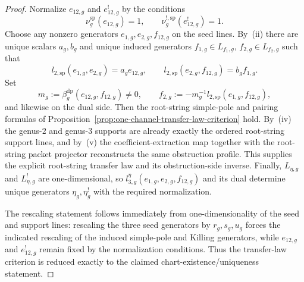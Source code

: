 \begin{proof}
Normalize $e_{12,g}$ and $e_{12,g}^!$ by the conditions
\[
\nu_g^{\mathrm{sp}}(e_{12,g})=1,
\qquad
\nu_g^{!,\mathrm{sp}}(e_{12,g}^!)=1.
\]
Choose any nonzero generators $e_{1,g},e_{2,g},f_{12,g}$ on the seed
lines.  By~\textup{(ii)} there are unique scalars $a_g,b_g$ and unique
induced generators $f_{1,g}\in L_{f_1,g}$, $f_{2,g}\in L_{f_2,g}$ such
that
\[
l_{2,\mathrm{sp}}(e_{1,g},e_{2,g})=a_g e_{12,g},
\qquad
l_{2,\mathrm{sp}}(e_{2,g},f_{12,g})=b_g f_{1,g}.
\]
Set
\[
m_g:=\beta_g^{\mathrm{dp}}(e_{12,g},f_{12,g})\neq 0,
\qquad
f_{2,g}:=-m_g^{-1}l_{2,\mathrm{sp}}(e_{1,g},f_{12,g}),
\]
and likewise on the dual side.  Then the root-string simple-pole and
pairing formulas of Proposition~\ref{prop:one-channel-transfer-law-criterion}
hold.  By~\textup{(iv)} the genus-$2$ and genus-$3$ supports are already
exactly the ordered root-string support lines, and by~\textup{(v)} the
coefficient-extraction map together with the root-string packet
projector reconstructs the same obstruction profile.  This supplies the
explicit root-string transfer law and its obstruction-side inverse.
Finally, $L_{\eta,g}$ and $L_{\eta,g}^!$ are one-dimensional, so
$l_{3,g}^\eta(e_{1,g},e_{2,g},f_{12,g})$ and its dual determine unique
generators $\eta_g,\eta_g^!$ with the required normalization.

The rescaling statement follows immediately from one-dimensionality of
the seed and support lines: rescaling the three seed generators by
$r_g,s_g,u_g$ forces the indicated rescaling of the induced
simple-pole and Killing generators, while $e_{12,g}$ and $e_{12,g}^!$
remain fixed by the normalization conditions.  Thus the transfer-law
criterion is reduced exactly to the claimed chart-existence/uniqueness
statement.
\end{proof}

